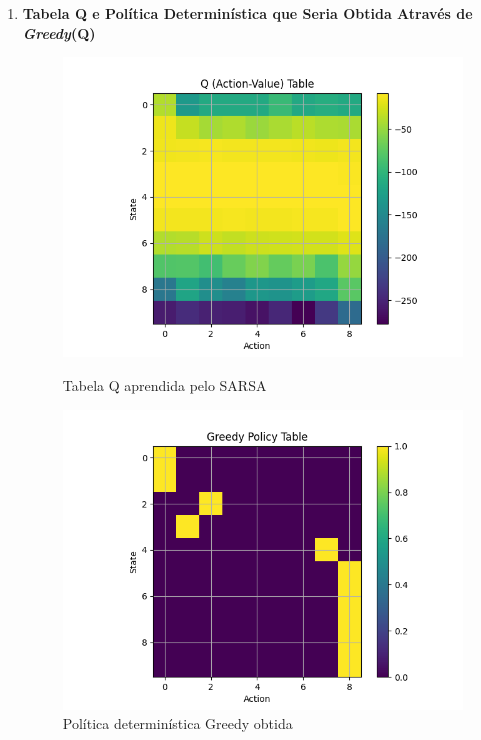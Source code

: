 \documentclass[a4paper,12pt]{article}
\begin{document}
\begin{enumerate}[label=2.1.\arabic*.]
    \item \textbf{Tabela Q e Política Determinística que Seria Obtida Através de \textit{Greedy}(Q)}\\
    \begin{figure}[h!]
      \centering
      \begin{minipage}{0.5\textwidth}
        \centering
        \includegraphics[width=\textwidth]{sarsa/action_value_table.png}
        \caption{Tabela Q aprendida pelo SARSA}
        \label{fig:sarsa_q_table}
      \end{minipage}\hfill
      \begin{minipage}{0.5\textwidth}
        \centering
        \includegraphics[width=\textwidth]{sarsa/greedy_policy_table.png}
        \caption{Política determinística Greedy obtida}
        \label{fig:sarsa_greedy_policy}
      \end{minipage}
    \end{figure}
    

\end{enumerate}
\end{document}
